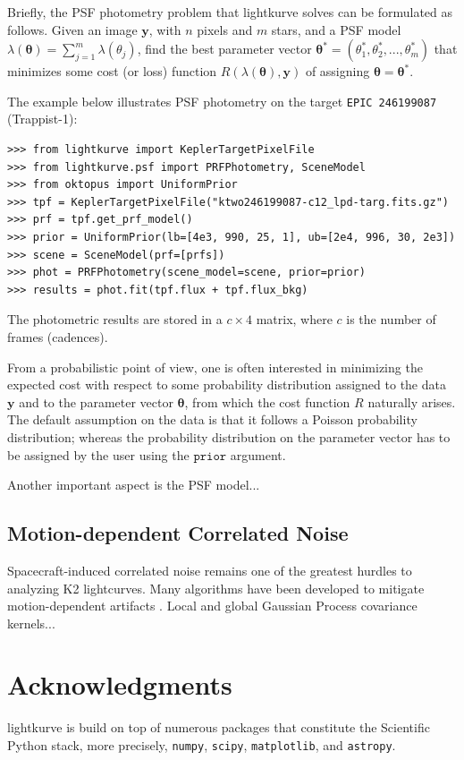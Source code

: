\documentclass{article}
\begin{document}
Briefly, the PSF photometry problem that lightkurve solves can be formulated as
follows. Given an image $\bm{y}$, with $n$ pixels and $m$ stars, and a PSF model
$\lambda(\bm{\theta}) = \sum_{j=1}^{m} \lambda({\theta}_j)$,
find the best parameter vector
$\bm{\theta}^{*} = (\theta_1^{*}, \theta_2^{*}, ..., \theta_m^{*})$
that minimizes some cost (or loss) function $R(\lambda(\bm{\theta}), \bm{y})$
of assigning $\bm{\theta} = \bm{\theta}^{*}$.

The example below illustrates PSF photometry on the target \texttt{EPIC 246199087}
(Trappist-1):

\begin{verbatim}
>>> from lightkurve import KeplerTargetPixelFile
>>> from lightkurve.psf import PRFPhotometry, SceneModel
>>> from oktopus import UniformPrior
>>> tpf = KeplerTargetPixelFile("ktwo246199087-c12_lpd-targ.fits.gz")
>>> prf = tpf.get_prf_model()
>>> prior = UniformPrior(lb=[4e3, 990, 25, 1], ub=[2e4, 996, 30, 2e3])
>>> scene = SceneModel(prf=[prfs])
>>> phot = PRFPhotometry(scene_model=scene, prior=prior)
>>> results = phot.fit(tpf.flux + tpf.flux_bkg)
\end{verbatim}

The photometric results are stored in a $c \times 4$ matrix, where $c$ is the
number of frames (cadences).

From a probabilistic point of view, one is often interested in minimizing the
expected cost with respect to some probability distribution assigned to the data
$\bm{y}$ and to the parameter vector $\bm{\theta}$, from which the cost function
$R$ naturally arises. The default assumption on the data is that it follows
a Poisson probability distribution; whereas the probability distribution on the
parameter vector has to be assigned by the user using the $\texttt{prior}$
argument.

Another important aspect is the PSF model...

\subsection{Motion-dependent Correlated Noise}

Spacecraft-induced correlated noise remains one of the greatest hurdles to analyzing K2 lightcurves.  Many algorithms have been developed to mitigate motion-dependent artifacts \cite{vanderburg14}.  Local and global Gaussian Process covariance kernels...

\label{subsection:motion}

\section{Acknowledgments}
lightkurve is build on top of numerous packages that constitute the Scientific Python
stack, more precisely, \texttt{numpy}, \texttt{scipy}, \texttt{matplotlib}, and
\texttt{astropy}.

\clearpage

%
%
\end{document}
